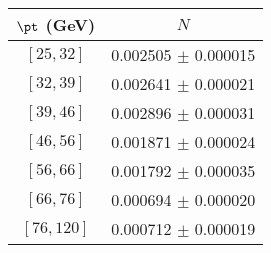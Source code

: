 \begin{tabular}{c||c}
$\pt$ (GeV) & $N$  \\
\hline
$[25, 32]$ & 0.002505 $\pm$ 0.000015\\
$[32, 39]$ & 0.002641 $\pm$ 0.000021\\
$[39, 46]$ & 0.002896 $\pm$ 0.000031\\
$[46, 56]$ & 0.001871 $\pm$ 0.000024\\
$[56, 66]$ & 0.001792 $\pm$ 0.000035\\
$[66, 76]$ & 0.000694 $\pm$ 0.000020\\
$[76, 120]$ & 0.000712 $\pm$ 0.000019\\
\end{tabular}
